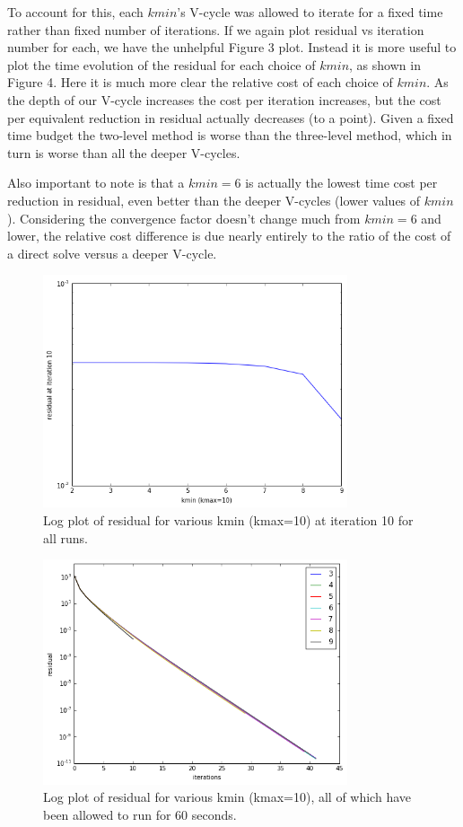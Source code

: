 \documentclass[letterpaper,10pt]{article}
\begin{document}
To account for this, each $kmin$'s V-cycle was allowed to iterate for a fixed time rather than fixed number of iterations. If we again plot residual vs iteration number for each, we have the unhelpful Figure 3 plot. Instead it is more useful to plot the time evolution of the residual for each choice of $kmin$, as shown in Figure 4. Here it is much more clear the relative cost of each choice of $kmin$. As the depth of our V-cycle increases the cost per iteration increases, but the cost per equivalent reduction in residual actually decreases (to a point). Given a fixed time budget the two-level method is worse than the three-level method, which in turn is worse than all the deeper V-cycles.

Also important to note is that a $kmin=6$ is actually the lowest time cost per reduction in residual, even better than the deeper V-cycles (lower values of $kmin$). Considering the convergence factor doesn't change much from $kmin=6$ and lower, the relative cost difference is due nearly entirely to the ratio of the cost of a direct solve versus a deeper V-cycle.

\begin{figure}[!htb]
\centering
\includegraphics[width=0.8\textwidth]{resit10.PNG}
\caption{Log plot of residual for various kmin (kmax=10) at iteration 10 for all runs.}
\end{figure}

\begin{figure}[!htb]
\centering
\includegraphics[width=0.8\textwidth]{resit.PNG}
\caption{Log plot of residual for various kmin (kmax=10), all of which have been allowed to run for 60 seconds.}
\end{figure}
\end{document}
